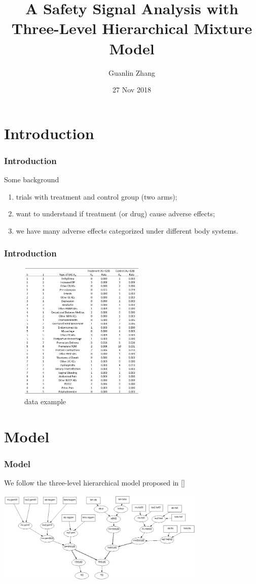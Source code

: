 \documentclass{beamer}[10]
\title{A Safety Signal Analysis with Three-Level Hierarchical Mixture Model}
\author{Guanlin Zhang}
\institute{Department of Biostatsitics \\ University of Kansas Medical Center}
\date{27 Nov 2018}
\begin{document}
\frame{\titlepage \vspace{-0.5cm}
}


\section{Introduction}

\begin{frame}
	\frametitle{Introduction}
	\begin{block}{Some background}
		\begin{enumerate}
			\item trials with treatment and control group (two arms);
			\item want to understand if treatment (or drug) cause adverse effects;
			\item we have many adverse effects categorized under different body systems.
		\end{enumerate}
	\end{block}
\end{frame}
\begin{frame}
	\frametitle{Introduction}
	\begin{figure}
		\centering
		\includegraphics[width = 6cm]{data.jpg}
		\caption{data example}
	\end{figure}
\end{frame}

\section{Model}

\begin{frame}
	\frametitle{Model}
	We follow the three-level hierarchical model proposed in [\cite{Berry04}]
	\begin{center}
		\includegraphics[width = 10cm]{doodle.jpg}
	\end{center}
\end{frame}
\end{document}
